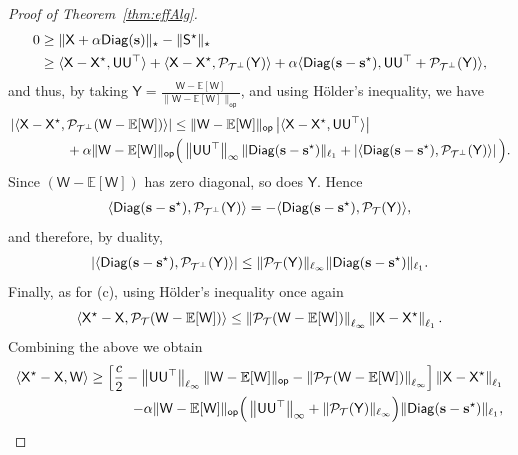 \documentclass[12pt]{article}
\newcommand{\bE}{\mathbb{E}}
\newcommand{\abs}[1]{\left|#1\right|}
\newcommand{\calP}{{\cal P}}
\newcommand{\calT}{{\cal T}}
\newcommand{\pp}[1]{\left[#1\right]}
\newcommand{\norm}[1]{\left\|#1\right\|}
\newcommand{\innerP}[1]{\left\langle#1\right\rangle}
\newcommand{\s}[1]{\mathsf{#1}}
\begin{document}
\begin{proof}[Proof of Theorem~\ref{thm:effAlg}]
\begin{align}
0 &\geq \|\s{X}+\alpha\s{Diag}(\mathbf{s})\|_\star-\|\s{S}^\star\|_\star\\
&\geq \langle \s{X} - \s{X}^\star, \s{U}\s{U}^\top \rangle + \langle \s{X} - \s{X}^\star, \calP_{\calT^\perp}(\s{Y}) \rangle + \alpha\langle \s{Diag}(\mathbf{s}-\mathbf{s}^\star), \s{U}\s{U}^\top + \calP_{\calT^\perp}(\s{Y}) \rangle,
\end{align}
and thus, by taking $\s{Y} = \frac{\s{W}-\bE[\s{W}]}{\|\s{W}-\bE[\s{W}]\|_{\s{op}}}$, and using H\"older's inequality, we have
\begin{align}
    &\abs{\langle \s{X}-\s{X}^\star, \calP_{\calT^\perp}(\s{W} - \bE[\s{W}]) \rangle}\leq \|\s{W}-\bE[\s{W}]\|_{\s{op}}\abs{\langle \s{X} - \s{X}^\star, \s{U}\s{U}^\top \rangle}\nonumber\\
    &\hspace{1.5cm}+\alpha\|\s{W}-\bE[\s{W}]\|_{\s{op}}\Big(\norm{\s{U}\s{U}^\top}_\infty \| \s{Diag}(\mathbf{s}-\mathbf{s}^\star)\|_{\ell_1}
    +\abs{\langle \s{Diag}(\mathbf{s}-\mathbf{s}^\star), \calP_{\calT^\perp}(\s{Y}) \rangle}\Big).
\end{align}
Since $(\s{W}-\bE[\s{W}])$ has zero diagonal, so does $\s{Y}$. Hence
\begin{align}
\langle \s{Diag}(\mathbf{s}-\mathbf{s}^\star), \calP_{\calT^\perp}(\s{Y}) \rangle
= - \langle \s{Diag}(\mathbf{s}-\mathbf{s}^\star), \calP_{\calT}(\s{Y}) \rangle,
\end{align}
and therefore, by duality,
\begin{align}
\abs{\langle \s{Diag}(\mathbf{s}-\mathbf{s}^\star), \calP_{\calT^\perp}(\s{Y}) \rangle}
\leq  \|\calP_{\calT}(\s{Y})\|_{\ell_\infty}\|\s{Diag}(\mathbf{s}-\mathbf{s}^\star)\|_{\ell_1}.
\end{align}
Finally, as for (c), using H\"older's inequality once again
\begin{align}
    \langle \s{X}^\star - \s{X}, \calP_{\calT}(\s{W}-\bE[\s{W}]) \rangle\leq \norm{\calP_{\calT}(\s{W} - \bE[\s{W}])}_{\ell_\infty} \norm{\s{X}-\s{X}^\star}_{\ell_1}.
\end{align}
Combining the above we obtain
\begin{align}
    \innerP{\s{X}^\star-\s{X},\s{W}}\geq\pp{\frac{c}{2}-\norm{\s{U}\s{U}^\top}_{\ell_\infty}\|\s{W}-\bE[\s{W}]\|_{\s{op}}-\norm{\calP_{\calT}(\s{W} - \bE[\s{W}])}_{\ell_\infty}}\norm{\s{X}-\s{X}^\star}_{\ell_1}\nonumber\\
    \hspace{1.8cm}-\alpha\|\s{W}-\bE[\s{W}]\|_{\s{op}}\Big(\norm{\s{U}\s{U}^\top}_\infty+\|\calP_{\calT}(\s{Y})\|_{\ell_\infty}\Big) \| \s{Diag}(\mathbf{s}-\mathbf{s}^\star)\|_{\ell_1},

\end{align}
\end{proof}
\end{document}
